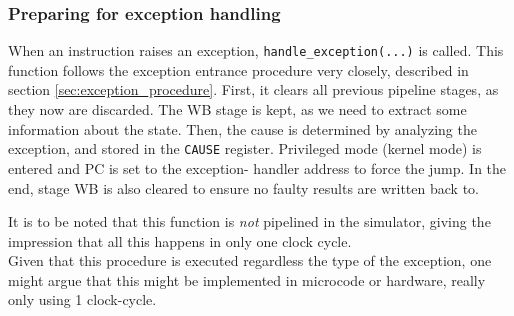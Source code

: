 \subsubsection{Preparing for exception handling}
When an instruction raises an exception, \texttt{handle\_exception(...)} is
called. This function follows the exception entrance procedure very closely,
described in section \ref{sec:exception_procedure}.
First, it clears all previous pipeline stages, as they now are discarded. The
WB stage is kept, as we need to extract some information about the state.
Then, the cause is determined by analyzing the exception, and stored in the
\texttt{CAUSE} register.
Privileged mode (kernel mode) is entered and PC is set to the exception-
handler address to force the jump.
In the end, stage WB is also cleared to ensure no faulty results are written
back to.
\iffalse
\begin{lstlisting}[language=C]
bzero(&IF_ID, sizeof(struct reg_if_id));
bzero(&ID_EX, sizeof(struct reg_id_ex));
bzero(&EX_MEM, sizeof(struct reg_ex_mem));
/* Data in MEM_WB is still needed */

/* 1. Save EPC */
core->cp0.regs[REG_EPC] = MEM_WB.next_pc - 4;

uint32_t cause = get_cause(MEM_WB.exception, MEM_WB.is_branch_delay);
core->cp0.regs[REG_CAUSE] = cause;

if(MEM_WB.exception == EXC_AddressErrorLoad
   || MEM_WB.exception == EXC_AddressErrorLoad) {
	core->cp0.regs[REG_BADVADDR] = MEM_WB.BadVAddr;
}

core->cp0.regs[REG_SR] |= SR_EXL;

core->regs[REG_PC] = (uint32_t)0x80000080;

bzero(&MEM_WB, sizeof(struct reg_mem_wb));
\end{lstlisting}
\fi
It is to be noted that this function is \emph{not} pipelined in the simulator,
giving the impression that all this happens in only one clock cycle.\\
Given that this procedure is executed regardless the type of the exception, one
might argue that this might be implemented in microcode or hardware, really only
using 1 clock-cycle.

